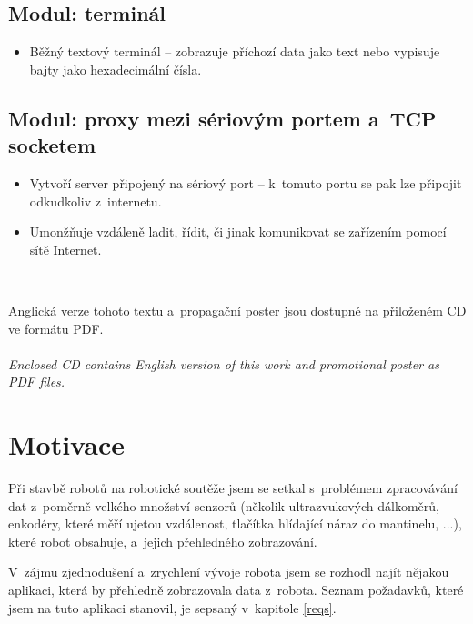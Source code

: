 \documentclass[12pt, a4paper, oneside]{article}
\newcommand{\It}{\textit}  %
\begin{document}
\subsection*{Modul: terminál}
\begin{itemize}
    \item Běžný textový terminál -- zobrazuje příchozí data jako text nebo vypisuje bajty jako hexadecimální čísla.
\end{itemize}

\subsection*{Modul: proxy mezi sériovým portem a~TCP socketem}
\begin{itemize}
    \item Vytvoří server připojený na sériový port -- k~tomuto portu se pak lze připojit odkudkoliv z~internetu.
    \item Umonžňuje vzdáleně ladit, řídit, či jinak komunikovat se zařízením pomocí sítě Internet.
\end{itemize}
~
\vspace{7mm}

\noindent Anglická verze tohoto textu a~propagační poster jsou dostupné na přiloženém CD ve formátu PDF.\\
\\
\noindent\It{Enclosed CD contains English version of this work and promotional poster as PDF files.}

\section{Motivace}
\label{motivace}
Při stavbě robotů na robotické soutěže jsem se setkal s~problémem zpracovávání dat z~poměrně velkého množství senzorů (několik ultrazvukových dálkoměrů, enkodéry, které měří ujetou vzdálenost, tlačítka hlídající náraz do mantinelu, ...), které robot obsahuje, a~jejich přehledného zobrazování. 

V~zájmu zjednodušení a~zrychlení vývoje robota jsem se rozhodl najít nějakou aplikaci, která by přehledně zobrazovala data z~robota. Seznam požadavků, které jsem na tuto aplikaci stanovil, je sepsaný v~kapitole \ref{reqs}.
\end{document}
